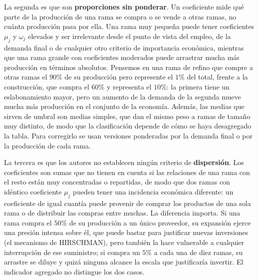 \documentclass[10pt,a4paper]{article}
\begin{document}
La segunda es que son \textbf{proporciones sin ponderar}. Un coeficiente mide qué parte de la producción de una rama se compra o se vende a otras ramas, no cuánta producción pasa por ella. Una rama muy pequeña puede tener coeficientes $\mu_j$ y $\omega_j$ elevados y ser irrelevante desde el punto de vista del empleo, de la demanda final o de cualquier otro criterio de importancia económica, mientras que una rama grande con coeficientes moderados puede arrastrar mucha más producción en términos absolutos. Pensemos en una rama de refino que compre a otras ramas el $90\%$ de su producción pero represente el $1\%$ del total, frente a la construcción, que compra el $60\%$ y representa el $10\%$: la primera tiene un eslabonamiento mayor, pero un aumento de la demanda de la segunda mueve mucha más producción en el conjunto de la economía. Además, las medias que sirven de umbral son medias simples, que dan el mismo peso a ramas de tamaño muy distinto, de modo que la clasificación depende de cómo se haya desagregado la tabla. Para corregirlo se usan versiones ponderadas por la demanda final o por la producción de cada rama.

La tercera es que los autores no establecen ningún criterio de \textbf{dispersión}. Los coeficientes son sumas que no tienen en cuenta si las relaciones de una rama con el resto están muy concentradas o repartidas, de modo que dos ramas con idéntico coeficiente $\mu_j$ pueden tener una incidencia económica diferente: un coeficiente de igual cuantía puede provenir de comprar los productos de una sola rama o de distribuir las compras entre muchas. La diferencia importa. Si una rama compra el $50\%$ de su producción a un único proveedor, su expansión ejerce una presión intensa sobre él, que puede bastar para justificar nuevas inversiones (el mecanismo de HIRSCHMAN), pero también la hace vulnerable a cualquier interrupción de ese suministro; si compra un $5\%$ a cada una de diez ramas, su arrastre se diluye y quizá ninguna alcance la escala que justificaría invertir. El indicador agregado no distingue los dos casos.
\end{document}
